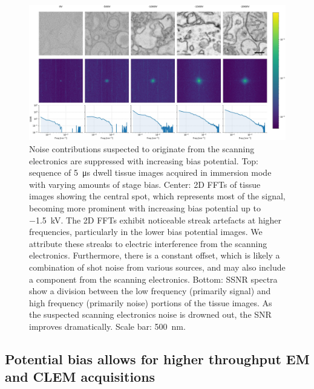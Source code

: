\begin{figure}[!tb]
    \centering
    \includegraphics[width=\linewidth]{chapter-2/figures_JPEG_HQ/fig2-5_noise.jpg}
    \caption{Noise contributions suspected to originate from the scanning electronics are suppressed with increasing bias potential. Top: sequence of \SI{5}{\micro\second} dwell tissue images acquired in immersion mode with varying amounts of stage bias. Center: 2D FFTs of tissue images showing the central spot, which represents most of the signal, becoming more prominent with increasing bias potential up to \SI{-1.5}{\kilo\volt}. The 2D FFTs exhibit noticeable streak artefacts at higher frequencies, particularly in the lower bias potential images. We attribute these streaks to electric interference from the scanning electronics. Furthermore, there is a constant offset, which is likely a combination of shot noise from various sources, and may also include a component from the scanning electronics. Bottom: SSNR spectra show a division between the low frequency (primarily signal) and high frequency (primarily noise) portions of the tissue images. As the suspected scanning electronics noise is drowned out, the SNR improves dramatically. Scale bar: \SI{500}{\nano\meter}.}
    \label{fig:2.5_noise}
\end{figure}


\subsection{Potential bias allows for higher throughput EM and CLEM acquisitions}

